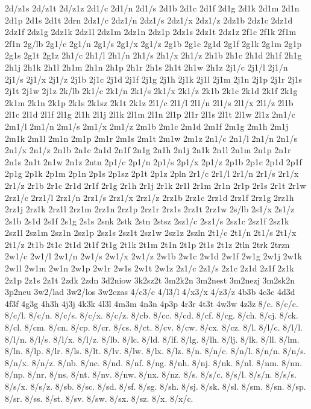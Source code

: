{2d/z1s
2d/z1t
2d/z1z
2d1/c
2d1/n
2d1/s
2d1b
2d1c
2d1f
2d1g
2d1k
2d1m
2d1n
2d1p
2d1s
2d1t
2drn
2dz1/c
2dz1/n
2dz1/s
2dz1/x
2dz1/z
2dz1b
2dz1c
2dz1d
2dz1f
2dz1g
2dz1k
2dz1l
2dz1m
2dz1n
2dz1p
2dz1s
2dz1t
2dz1z
2f1c
2f1k
2f1m
2f1n
2g/lb
2g1/c
2g1/n
2g1/s
2g1/x
2g1/z
2g1b
2g1c
2g1d
2g1f
2g1k
2g1m
2g1p
2g1s
2g1t
2g1z
2h1/c
2h1/l
2h1/n
2h1/s
2h1/x
2h1/z
2h1b
2h1c
2h1d
2h1f
2h1g
2h1j
2h1k
2h1l
2h1m
2h1n
2h1p
2h1r
2h1s
2h1t
2h1w
2h1z
2j1/c
2j1/l
2j1/n
2j1/s
2j1/x
2j1/z
2j1b
2j1c
2j1d
2j1f
2j1g
2j1h
2j1k
2j1l
2j1m
2j1n
2j1p
2j1r
2j1s
2j1t
2j1w
2j1z
2k/lb
2k1/c
2k1/n
2k1/s
2k1/x
2k1/z
2k1b
2k1c
2k1d
2k1f
2k1g
2k1m
2k1n
2k1p
2k1s
2k1sz
2k1t
2k1z
2l1/c
2l1/l
2l1/n
2l1/s
2l1/x
2l1/z
2l1b
2l1c
2l1d
2l1f
2l1g
2l1h
2l1j
2l1k
2l1m
2l1n
2l1p
2l1r
2l1s
2l1t
2l1w
2l1z
2m1/c
2m1/l
2m1/n
2m1/s
2m1/x
2m1/z
2m1b
2m1c
2m1d
2m1f
2m1g
2m1h
2m1j
2m1k
2m1l
2m1n
2m1p
2m1r
2m1s
2m1t
2m1w
2m1z
2n1/c
2n1/l
2n1/n
2n1/s
2n1/x
2n1/z
2n1b
2n1c
2n1d
2n1f
2n1g
2n1h
2n1j
2n1k
2n1l
2n1m
2n1p
2n1r
2n1s
2n1t
2n1w
2n1z
2ntn
2p1/c
2p1/n
2p1/s
2p1/x
2p1/z
2p1b
2p1c
2p1d
2p1f
2p1g
2p1k
2p1m
2p1n
2p1s
2p1sz
2p1t
2p1z
2pln
2r1/c
2r1/l
2r1/n
2r1/s
2r1/x
2r1/z
2r1b
2r1c
2r1d
2r1f
2r1g
2r1h
2r1j
2r1k
2r1l
2r1m
2r1n
2r1p
2r1s
2r1t
2r1w
2rz1/c
2rz1/l
2rz1/n
2rz1/s
2rz1/x
2rz1/z
2rz1b
2rz1c
2rz1d
2rz1f
2rz1g
2rz1h
2rz1j
2rz1k
2rz1l
2rz1m
2rz1n
2rz1p
2rz1r
2rz1s
2rz1t
2rz1w
2s/lb
2s1/x
2s1/z
2s1b
2s1d
2s1f
2s1g
2s1s
2snk
2stk
2stn
2stsz
2sz1/c
2sz1/s
2sz1c
2sz1f
2sz1k
2sz1l
2sz1m
2sz1n
2sz1p
2sz1s
2sz1t
2sz1w
2sz1z
2szln
2t1/c
2t1/n
2t1/s
2t1/x
2t1/z
2t1b
2t1c
2t1d
2t1f
2t1g
2t1k
2t1m
2t1n
2t1p
2t1s
2t1z
2tln
2trk
2trzn
2w1/c
2w1/l
2w1/n
2w1/s
2w1/x
2w1/z
2w1b
2w1c
2w1d
2w1f
2w1g
2w1j
2w1k
2w1l
2w1m
2w1n
2w1p
2w1r
2w1s
2w1t
2w1z
2z1/c
2z1/s
2z1c
2z1d
2z1f
2z1k
2z1p
2z1s
2z1t
2zdk
2zdn
3d2niow
3k2sz2t
3m2k2n
3m2nest
3m2nezj
3m2sk2n
3p2neu
3w2/lad
3w2/los
3w2czas
4/c3/c
4/l3/l
4/x3/x
4/z3/z
4b3b
4c3c
4d3d
4f3f
4g3g
4h3h
4j3j
4k3k
4l3l
4m3m
4n3n
4p3p
4r3r
4t3t
4w3w
4z3z
8/c.
8/c/c.
8/c/l.
8/c/n.
8/c/s.
8/c/x.
8/c/z.
8/cb.
8/cc.
8/cd.
8/cf.
8/cg.
8/ch.
8/cj.
8/ck.
8/cl.
8/cm.
8/cn.
8/cp.
8/cr.
8/cs.
8/ct.
8/cv.
8/cw.
8/cx.
8/cz.
8/l.
8/l/c.
8/l/l.
8/l/n.
8/l/s.
8/l/x.
8/l/z.
8/lb.
8/lc.
8/ld.
8/lf.
8/lg.
8/lh.
8/lj.
8/lk.
8/ll.
8/lm.
8/ln.
8/lp.
8/lr.
8/ls.
8/lt.
8/lv.
8/lw.
8/lx.
8/lz.
8/n.
8/n/c.
8/n/l.
8/n/n.
8/n/s.
8/n/x.
8/n/z.
8/nb.
8/nc.
8/nd.
8/nf.
8/ng.
8/nh.
8/nj.
8/nk.
8/nl.
8/nm.
8/nn.
8/np.
8/nr.
8/ns.
8/nt.
8/nv.
8/nw.
8/nx.
8/nz.
8/s.
8/s/c.
8/s/l.
8/s/n.
8/s/s.
8/s/x.
8/s/z.
8/sb.
8/sc.
8/sd.
8/sf.
8/sg.
8/sh.
8/sj.
8/sk.
8/sl.
8/sm.
8/sn.
8/sp.
8/sr.
8/ss.
8/st.
8/sv.
8/sw.
8/sx.
8/sz.
8/x.
8/x/c.
}
